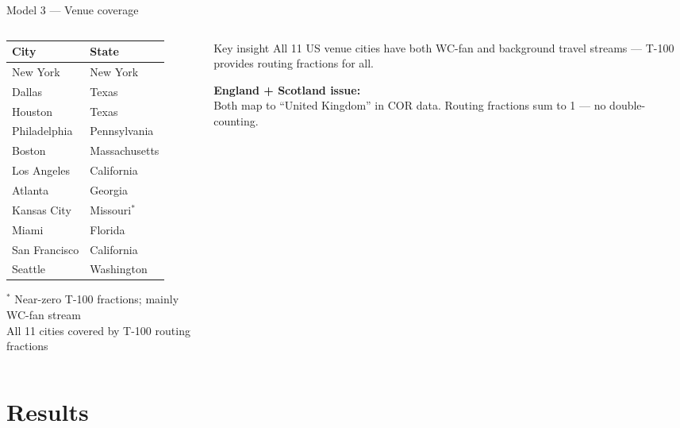 \documentclass[aspectratio=169, 11pt]{beamer}
\begin{document}
\begin{frame}{Model 3 — Venue coverage}
  \begin{columns}[T]
    \begin{column}{0.52\textwidth}
      \footnotesize
      \begin{tabular}{ll}
        \toprule
        \textbf{City} & \textbf{State} \\
        \midrule
        New York      & New York \\
        Dallas        & Texas \\
        Houston       & Texas \\
        Philadelphia  & Pennsylvania \\
        Boston        & Massachusetts \\
        Los Angeles   & California \\
        Atlanta       & Georgia \\
        Kansas City   & Missouri$^*$ \\
        Miami         & Florida \\
        San Francisco & California \\
        Seattle       & Washington \\
        \bottomrule
      \end{tabular}
      {\tiny $^*$ Near-zero T-100 fractions; mainly WC-fan stream\\
      All 11 cities covered by T-100 routing fractions}
    \end{column}
    \begin{column}{0.45\textwidth}
      \small
      \begin{block}{Key insight}
        All 11 US venue cities have both WC-fan and background
        travel streams — T-100 provides routing fractions for all.
      \end{block}
      \smallskip
      \textbf{England + Scotland issue:}\\
      Both map to ``United Kingdom'' in COR data. Routing fractions
      sum to 1 — no double-counting.
    \end{column}
  \end{columns}
\end{frame}

\section{Results}
\end{document}
